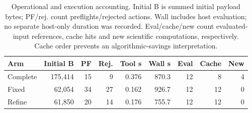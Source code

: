 \begin{table}[tbp]
\centering\small
\setlength{\tabcolsep}{4.5pt}
\caption{Operational and execution accounting. Initial B is summed initial payload bytes; PF/rej. count preflights/rejected actions. Wall includes host evaluation; no separate host-only duration was recorded. Eval/cache/new count evaluated-input references, cache hits and new scientific computations, respectively. Cache order prevents an algorithmic-savings interpretation.}
\label{tab:abc-accounting}
\begin{tabular}{lrrrrrrrr}
\toprule
Arm & Initial B & PF & Rej. & Tool s & Wall s & Eval & Cache & New \\
\midrule
Complete & 175,414 & 15 & 9 & 0.376 & 870.3 & 12 & 8 & 4 \\
Fixed & 62,054 & 34 & 27 & 0.162 & 926.7 & 12 & 12 & 0 \\
Refine & 61,850 & 20 & 14 & 0.176 & 755.7 & 12 & 12 & 0 \\
\bottomrule
\end{tabular}
\end{table}
